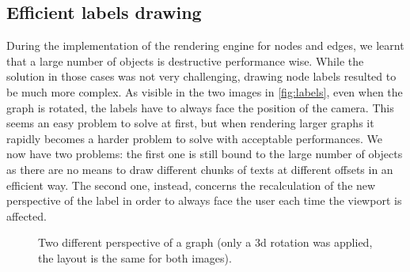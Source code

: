 \subsection{Efficient labels drawing}

During the implementation of the rendering engine for nodes and edges, we learnt that a large number of objects is destructive performance wise. While the solution in those cases was not very challenging, drawing node labels resulted to be much more complex. As visible in the two images in \vref{fig:labels}, even when the graph is rotated, the labels have to always face the position of the camera. This seems an easy problem to solve at first, but when rendering larger graphs it rapidly becomes a harder problem to solve with acceptable performances. We now have two problems: the first one is still bound to the large number of objects as there are no means to draw different chunks of texts at different offsets in an efficient way. The second one, instead, concerns the recalculation of the new perspective of the label in order to always face the user each time the viewport is affected.

\begin{figure}[p]
	\hfill
  \caption[Two different perspectives of the same graph.]{Two different perspective of a graph (only a \gls{3d} rotation was applied, the layout is the same for both images).}%
  \label{fig:labels}
\end{figure}

